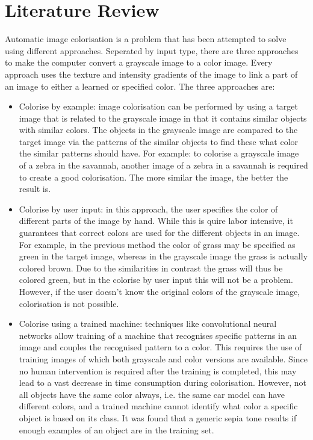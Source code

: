 \section{Literature Review} \label{sec:litreview}
Automatic image colorisation is a problem that has been attempted to solve using different approaches. Seperated by input type, there are three approaches to make the computer convert a grayscale image to a color image. Every approach uses the texture and intensity gradients of the image to link a part of an image to either a learned or specified color. The three approaches are:


\begin{itemize}
	\item Colorise by example: image colorisation can be performed by using a target image that is related to the grayscale image in that it contains similar objects with similar colors. The objects in the grayscale image are compared to the target image via the patterns of the similar objects to find these what color the similar patterns should have. For example: to colorise a grayscale image of a zebra in the savannah, another image of a zebra in a savannah is required to create a good colorisation. The more similar the image, the better the result is.
	
	\item Colorise by user input: in this approach, the user specifies the color of different parts of the image by hand. While this is quire labor intensive, it guarantees that correct colors are used for the different objects in an image. For example, in the previous method the color of grass may be specified as green in the target image, whereas in the grayscale image the grass is actually colored brown. Due to the similarities in contrast the grass will thus be colored green, but in the colorise by user input this will not be a problem. However, if the user doesn't know the original colors of the grayscale image, colorisation is not possible.
	
	\item Colorise using a trained machine: techniques like convolutional neural networks allow training of a machine that recognises specific patterns in an image and couples the recognised pattern to a color. This requires the use of training images of which both grayscale and color versions are available. Since no human intervention is required after the training is completed, this may lead to a vast decrease in time consumption during colorisation. However, not all objects have the same color always, i.e. the same car model can have different colors, and a trained machine cannot identify what color a specific object is based on its class. It was found that a generic sepia tone results if enough examples of an object are in the training set.

\end{itemize}









